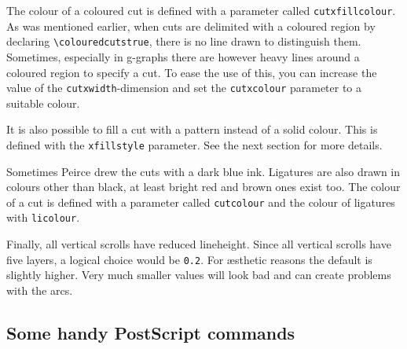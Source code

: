 \documentclass[a4paper,justified]{tufte-handout}
\newcommand{\greek}[1]{{\selectlanguage{polutonikogreek}#1\selectlanguage{english}}}
\begin{document}
The colour of a coloured cut\label{colouredcutcolour} is defined with a parameter called \texttt{cutxfillcolour}. As was mentioned earlier, when cuts are delimited with a coloured region by declaring \verb|\colouredcutstrue|, there is no line drawn to distinguish them. Sometimes, especially in \greek{g}-graphs there are however heavy lines around a coloured region to specify a cut. To ease the use of this, you can increase the value of the \texttt{cutxwidth}-dimension and set the \texttt{cutxcolour} parameter to a suitable colour.%


It is also possible to fill a cut with a pattern instead of a solid colour. This is defined with the \texttt{xfillstyle} parameter. See the next section for more details.

Sometimes Peirce drew the cuts with a dark blue ink. Ligatures are also drawn in colours other than black, at least bright red and brown ones exist too. The colour of a cut is defined with a parameter called \texttt{cutcolour} and the colour of ligatures with \texttt{licolour}.%
%

Finally, all vertical scrolls have reduced lineheight. Since all vertical scrolls have five layers, a logical choice would be \texttt{0.2}. For \ae sthetic reasons the default is slightly higher. Very much smaller values will look bad and can create problems with the arcs. 

\subsection{\hspace*{-8pt}Some handy PostScript commands}
\end{document}

